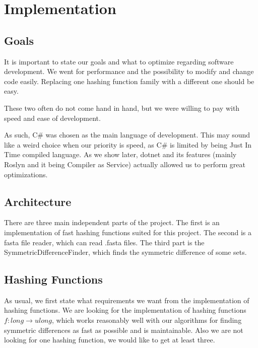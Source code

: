 \chapter{Implementation}

\section{Goals}
It is important to state our goals and what to optimize regarding software development. We went for performance and the possibility to modify and change code easily. Replacing one hashing function family with a different one should be easy.  

These two often do not come hand in hand, but we were willing to pay with speed and ease of development.

As such, C\# was chosen as the main language of development. This may sound like a weird choice when our priority is speed, as C\# is limited by being Just In Time compiled language. As we show later, dotnet and its features (mainly Roslyn and it being Compiler as Service) actually allowed us to perform great optimizations. 


\section{Architecture}
There are three main independent parts of the project. The first is an implementation of fast hashing functions suited for this project. The second is a fasta file reader, which can read .fasta files. The third part is the SymmetricDifferenceFinder, which finds the symmetric difference of some sets.


\section{}

\section{Hashing Functions}

As usual, we first state what requirements we want from the implementation of hashing functions. We are looking for the implementation of hashing functions $f: long \rightarrow ulong$, which works reasonably well with our algorithms for finding symmetric differences as fast as possible and is maintainable. Also we are not looking for one hashing function, we would like to get at least three.

